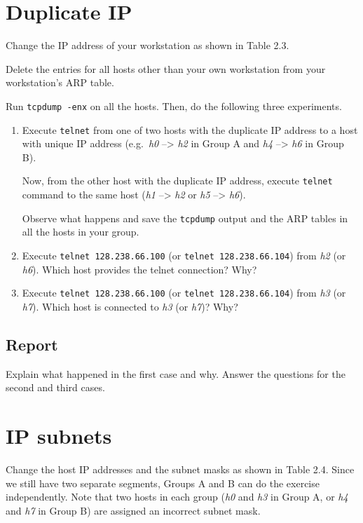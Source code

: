 \documentclass{../UTNetLab}
\begin{document}
\section{Duplicate IP}
    Change the IP address of your workstation as shown in Table 2.3.

    Delete the entries for all hosts other than your own workstation from your workstation’s ARP table.

    Run \lstinline{tcpdump -enx} on all the hosts.
    Then, do the following three experiments.

    \begin{enumerate}
        \item Execute \lstinline{telnet} from one of two hosts with the duplicate IP address to a host with unique IP address (e.g.\ \textit{h0} –> \textit{h2} in Group A and \textit{h4} –> \textit{h6} in Group B).

        Now, from the other host with the duplicate IP address, execute \lstinline{telnet} command to the same host (\textit{h1} –> \textit{h2} or \textit{h5} –> \textit{h6}).

        Observe what happens and save the \lstinline{tcpdump} output and the ARP tables in all the hosts in your group.
        
        \item Execute \lstinline{telnet 128.238.66.100} (or \lstinline{telnet 128.238.66.104}) from \textit{h2} (or \textit{h6}).
        Which host provides the telnet connection?
        Why?
        
        \item Execute \lstinline{telnet 128.238.66.100} (or \lstinline{telnet 128.238.66.104}) from \textit{h3} (or \textit{h7}). Which host is connected to \textit{h3} (or \textit{h7})? Why?
    \end{enumerate}
    
    \subsection*{Report}
    Explain what happened in the first case and why.
    Answer the questions for the second and third cases.

\section{IP subnets}
    Change the host IP addresses and the subnet masks as shown in Table 2.4. Since we still have two separate segments, Groups A and B can do the exercise independently.
    Note that two hosts in each group (\textit{h0} and \textit{h3} in Group A, or \textit{h4} and \textit{h7} in Group B) are assigned an incorrect subnet mask.
\end{document}
